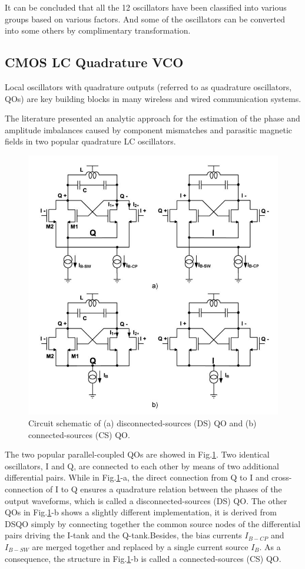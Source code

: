 \documentclass[conference]{IEEEtran}
\begin{document}
It can be concluded that all the 12 oscillators have been classified into various groups based on various factors. And some of the oscillators can be converted into some others by complimentary transformation.

\subsection{CMOS LC Quadrature VCO}
Local oscillators with quadrature outputs (referred to as quadrature oscillators, QOs) are key building blocks in many wireless and wired communication systems. 

The literature \cite{b8} presented an analytic approach for the estimation of the phase and amplitude imbalances caused by component mismatches and parasitic magnetic fields in two popular quadrature LC oscillators. 
\begin{figure}[!h]
\centerline{\includegraphics[scale=0.35]{fig/pic4-4.jpg}}
\caption{Circuit schematic of (a) disconnected-sources (DS) QO and (b) connected-sources (CS) QO.\cite{b8}}
\label{fig4-4}
\end{figure}

The two popular parallel-coupled QOs are showed in Fig.\ref{fig4-4}. Two identical oscillators, I and Q, are connected to each other by means of two additional differential pairs. While in Fig.\ref{fig4-4}-a, the direct connection from Q to I and cross-connection of I to Q ensures a quadrature relation between the phases of the output waveforms, which is called a disconnected-sources (DS) QO. The other QOs in Fig.\ref{fig4-4}-b  shows a slightly different implementation, it is derived from DSQO simply by connecting together the common source nodes of the differential pairs driving the I-tank and the Q-tank.Besides, the bias currents $I_{B-CP}$ and $I_{B-SW}$ are merged together and replaced by a single current source $I_B$. As a consequence, the structure in Fig.\ref{fig4-4}-b is called a connected-sources (CS) QO. 
\end{document}
